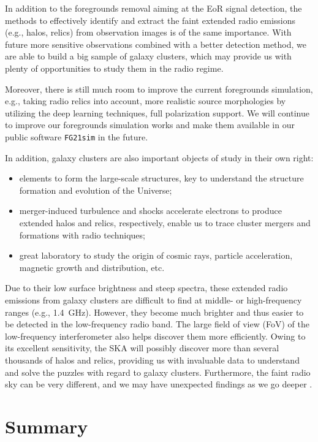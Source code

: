 \documentclass[modern]{aastex62}
\begin{document}
In addition to the foregrounds removal aiming at the EoR signal
detection, the methods to effectively identify and extract the faint
extended radio emissions (e.g., halos, relics) from observation images
is of the same importance.
With future more sensitive observations combined with a better detection
method, we are able to build a big sample of galaxy clusters, which
may provide us with plenty of opportunities to study them in the radio
regime.

Moreover, there is still much room to improve the current foregrounds
simulation, e.g., taking radio relics into account, more realistic
source morphologies by utilizing the deep learning techniques,
full polarization support.
We will continue to improve our foregrounds simulation works and make
them available in our public software \texttt{FG21sim} in the future.

In addition, galaxy clusters are also important objects of study in their
own right:
\begin{itemize}
  \item elements to form the large-scale structures, key to understand the
    structure formation and evolution of the Universe;
  \item merger-induced turbulence and shocks accelerate electrons to produce
    extended halos and relics, respectively, enable us to trace cluster
    mergers and formations with radio techniques;
  \item great laboratory to study the origin of cosmic rays, particle
    acceleration, magnetic growth and distribution, etc.
\end{itemize}

Due to their low surface brightness and steep spectra, these extended
radio emissions from galaxy clusters are difficult to find at middle-
or high-frequency ranges (e.g., \SI{1.4}{\GHz}).
However, they become much brighter and thus easier to be detected in
the low-frequency radio band.  The large field of view (FoV) of the
low-frequency interferometer also helps discover them more efficiently.
Owing to its excellent sensitivity, the SKA will possibly discover more
than several thousands of halos and relics, providing us with invaluable
data to understand and solve the puzzles with regard to galaxy clusters.
Furthermore, the faint radio sky can be very different, and we may have
unexpected findings as we go deeper \citep{padovani2016rev,herreraRuiz2017}.


\section{Summary}
\label{sec:summary}
\end{document}
